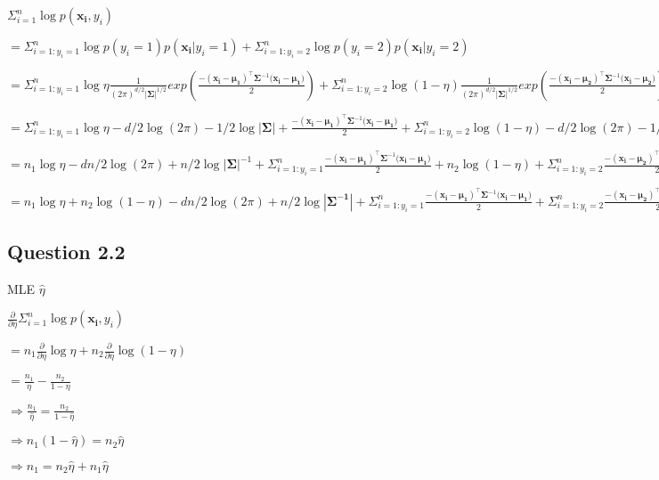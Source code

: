 \documentclass[
]{article}
\begin{document}
\(\Sigma_{i=1}^n \log p(\mathbf{x_i}, y_i)\)

\(=\Sigma_{i=1:y_i=1}^n \log p(y_i = 1)p(\mathbf{x_i}|y_i = 1) + \Sigma_{i=1:y_i=2}^n \log p(y_i = 2)p(\mathbf{x_i}|y_i = 2)\)

\(=\Sigma_{i=1:y_i=1}^n \log \eta \frac{1}{(2\pi)^{d/2}|\mathbf{\Sigma}|^{1/2}}exp(\frac{-(\mathbf{x_i-\mu_1})^\top \mathbf{\Sigma}^{-1} (\mathbf{x_i-\mu_1)}}{2}) + \Sigma_{i=1:y_i=2}^n \log (1 - \eta) \frac{1}{(2\pi)^{d/2}|\mathbf{\Sigma}|^{1/2}}exp(\frac{-(\mathbf{x_i-\mu_2})^\top \mathbf{\Sigma}^{-1} (\mathbf{x_i-\mu_2)}}{2})\)

\(=\Sigma_{i=1:y_i=1}^n \log \eta - d/2\log(2\pi) - 1/2\log|\mathbf{\Sigma}| + \frac{-(\mathbf{x_i-\mu_1})^\top \mathbf{\Sigma}^{-1} (\mathbf{x_i-\mu_1)}}{2} + \Sigma_{i=1:y_i=2}^n \log (1 - \eta) - d/2\log(2\pi) - 1/2\log|\mathbf{\Sigma}| + \frac{-(\mathbf{x_i-\mu_2})^\top \mathbf{\Sigma}^{-1} (\mathbf{x_i-\mu_2)}}{2}\)

\(=n_1\log \eta - dn/2\log(2\pi) + n/2\log|\mathbf{\Sigma}|^{-1} + \Sigma_{i=1:y_i=1}^n\frac{-(\mathbf{x_i-\mu_1})^\top \mathbf{\Sigma}^{-1} (\mathbf{x_i-\mu_1)}}{2} + n_2\log (1 - \eta) + \Sigma_{i=1:y_i=2}^n\frac{-(\mathbf{x_i-\mu_2})^\top \mathbf{\Sigma}^{-1} (\mathbf{x_i-\mu_2)}}{2}\)

\(=n_1\log \eta + n_2\log (1 - \eta) - dn/2\log(2\pi) + n/2\log|\mathbf{\Sigma^{-1}}| + \Sigma_{i=1:y_i=1}^n\frac{-(\mathbf{x_i-\mu_1})^\top \mathbf{\Sigma}^{-1} (\mathbf{x_i-\mu_1)}}{2} + \Sigma_{i=1:y_i=2}^n\frac{-(\mathbf{x_i-\mu_2})^\top \mathbf{\Sigma}^{-1} (\mathbf{x_i-\mu_2)}}{2}\)

\hypertarget{question-2.2}{%
\subsection{Question 2.2}\label{question-2.2}}

MLE \(\hat\eta\)

\(\frac{\partial}{\partial \eta} \Sigma_{i=1}^n \log p(\mathbf{x_i}, y_i)\)

\(=n_1\frac{\partial}{\partial \eta}\log \eta + n_2\frac{\partial}{\partial \eta}\log (1 - \eta)\)

\(=\frac{n_1}{\eta} - \frac{n_2}{1 - \eta}\)

\(\Rightarrow \frac{n_1}{\hat\eta} = \frac{n_2}{1 - \hat\eta}\)

\(\Rightarrow n_1(1 - \hat\eta) = n_2\hat\eta\)

\(\Rightarrow n_1 = n_2\hat\eta + n_1\hat\eta\)
\end{document}
